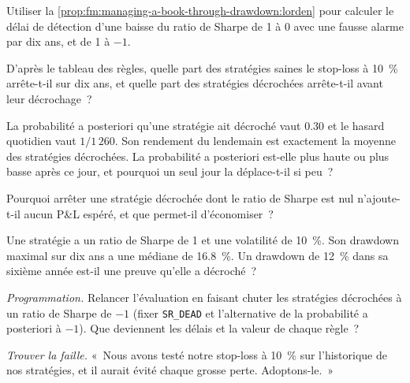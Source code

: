 \begin{exercise}[$\star$]\label{exo:fm:managing-a-book-through-drawdown:2}
Utiliser la \cref{prop:fm:managing-a-book-through-drawdown:lorden} pour calculer le délai de détection d'une baisse du ratio de Sharpe de 1 à 0 avec une fausse alarme
par dix ans, et de 1 à $-1$.
\end{exercise}

\begin{exercise}[$\star$]\label{exo:fm:managing-a-book-through-drawdown:3}
D'après le tableau des règles, quelle part des stratégies saines le stop-loss à 10~\% arrête-t-il sur dix ans, et quelle part des stratégies décrochées arrête-t-il
avant leur décrochage~?
\end{exercise}

\begin{exercise}[$\star\star$]\label{exo:fm:managing-a-book-through-drawdown:4}
La probabilité a posteriori qu'une stratégie ait décroché vaut 0.30 et le hasard quotidien vaut $1/1\,260$. Son rendement du lendemain est exactement la moyenne des stratégies décrochées. La probabilité
a posteriori est-elle plus haute ou plus basse après ce jour, et pourquoi un seul jour la déplace-t-il si peu~?
\end{exercise}

\begin{exercise}[$\star\star$]\label{exo:fm:managing-a-book-through-drawdown:5}
Pourquoi arrêter une stratégie décrochée dont le ratio de Sharpe est nul n'ajoute-t-il aucun P\&L espéré, et que permet-il d'économiser~?
\end{exercise}

\begin{exercise}[$\star\star$]\label{exo:fm:managing-a-book-through-drawdown:6}
Une stratégie a un ratio de Sharpe de 1 et une volatilité de 10~\%. Son drawdown maximal sur dix ans a une médiane de 16.8~\%. Un drawdown de 12~\% dans sa
sixième année est-il une preuve qu'elle a décroché~?
\end{exercise}

\begin{exercise}[$\star\star\star$]\label{exo:fm:managing-a-book-through-drawdown:7}
\emph{Programmation.} Relancer l'évaluation en faisant chuter les stratégies décrochées à un ratio de Sharpe de $-1$ (fixer \texttt{SR\_DEAD} et l'alternative de la
probabilité a posteriori à $-1$). Que deviennent les délais et la valeur de chaque règle~?
\end{exercise}

\begin{exercise}[$\star\star\star$]\label{exo:fm:managing-a-book-through-drawdown:8}
\emph{Trouver la faille.} «~Nous avons testé notre stop-loss à 10~\% sur l'historique de nos stratégies, et il aurait évité chaque grosse perte. Adoptons-le.~»
\end{exercise}

